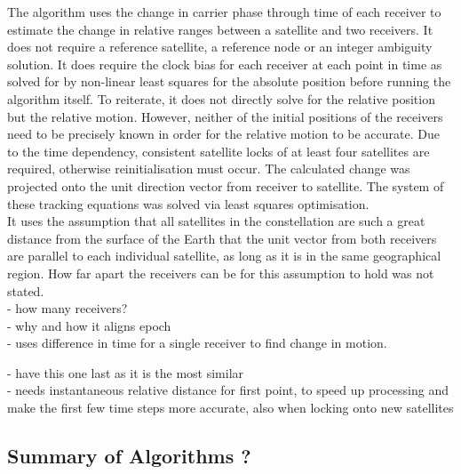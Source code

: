 The algorithm uses the change in carrier phase through time of each receiver to estimate the change in relative ranges between a satellite and two receivers. It does not require a reference satellite, a reference node or an integer ambiguity solution. It does require the clock bias for each receiver at each point in time as solved for by non-linear least squares for the absolute position before running the algorithm itself. To reiterate, it does not directly solve for the relative position but the relative motion. However, neither of the initial positions of the receivers need to be precisely known in order for the relative motion to be accurate. Due to the time dependency, consistent satellite locks of at least four satellites are required, otherwise reinitialisation must occur. The calculated change was projected onto the unit direction vector from receiver to satellite. The system of these tracking equations was solved via least squares optimisation. \\

It uses the assumption that all satellites in the constellation are such a great distance from the surface of the Earth that the unit vector from both receivers are parallel to each individual satellite, as long as it is in the same geographical region. How far apart the receivers can be for this assumption to hold was not stated.\\ 




- how many receivers?\\
- why and how it aligns epoch\\
- uses difference in time for a single receiver to find change in motion.



- have this one last as it is the most similar\\
- needs instantaneous relative distance for first point, to speed up processing and make the first few time steps more accurate, also when locking onto new satellites


\subsection{Summary of Algorithms ?}

